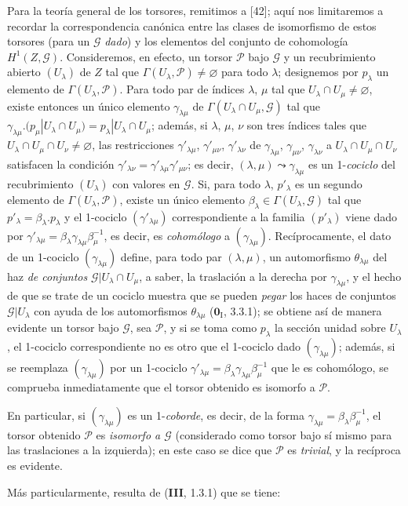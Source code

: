\begin{env}[16.5.15]
Para la teoría general de los torsores, remitimos a [42]; aquí nos
limitaremos a recordar la correspondencia canónica entre las clases
de isomorfismo de estos torsores (para un $\mathscr{G}$ \emph{dado}) y los elementos del
conjunto de cohomología $H^1(Z,\mathscr{G})$. Consideremos, en efecto, un
torsor $\mathscr{P}$ bajo $\mathscr{G}$ y un recubrimiento abierto
$(U_\lambda)$ de $Z$ tal que
$\Gamma(U_\lambda,\mathscr{P})\neq\varnothing$ para todo $\lambda$;
designemos por $p_\lambda$ un elemento de
$\Gamma(U_\lambda,\mathscr{P})$. Para todo par de índices $\lambda$, $\mu$
tal que $U_\lambda\cap U_\mu\neq\varnothing$, existe entonces un único elemento
$\gamma_{\lambda\mu}$ de
$\Gamma(U_\lambda\cap U_\mu,\mathscr{G})$ tal que
$\gamma_{\lambda\mu}.(p_\mu|U_\lambda\cap U_\mu)=p_\lambda|U_\lambda\cap U_\mu$;
además, si $\lambda$, $\mu$, $\nu$ son tres índices tales que
$U_\lambda\cap U_\mu\cap U_\nu\neq\varnothing$, las restricciones
$\gamma'_{\lambda\mu}$, $\gamma'_{\mu\nu}$, $\gamma'_{\lambda\nu}$ de
$\gamma_{\lambda\mu}$, $\gamma_{\mu\nu}$, $\gamma_{\lambda\nu}$ a
$U_\lambda\cap U_\mu\cap U_\nu$ satisfacen la condición
$\gamma'_{\lambda\nu}=\gamma'_{\lambda\mu}\gamma'_{\mu\nu}$; es decir,
$(\lambda,\mu)\leadsto\gamma_{\lambda\mu}$ es un 1-\emph{cociclo} del
recubrimiento $(U_\lambda)$ con valores en $\mathscr{G}$. Si, para todo
$\lambda$, $p'_\lambda$ es un segundo elemento de
$\Gamma(U_\lambda,\mathscr{P})$, existe un único elemento
$\beta_\lambda\in\Gamma(U_\lambda,\mathscr{G})$ tal que
$p'_\lambda=\beta_\lambda.p_\lambda$ y el 1-cociclo
$(\gamma'_{\lambda\mu})$ correspondiente a la familia $(p'_\lambda)$ viene dado
por
$\gamma'_{\lambda\mu}=\beta_\lambda\gamma_{\lambda\mu}\beta_\mu^{-1}$,
es decir, es \emph{cohomólogo} a $(\gamma_{\lambda\mu})$.
Recíprocamente, el dato de un 1-cociclo $(\gamma_{\lambda\mu})$ define, para
todo par $(\lambda,\mu)$, un automorfismo $\theta_{\lambda\mu}$ del
haz \emph{de conjuntos}
$\mathscr{G}|U_\lambda\cap U_\mu$, a saber, la traslación a la derecha por
$\gamma_{\lambda\mu}$, y el hecho de que se trate de un cociclo muestra que se
pueden \emph{pegar} los haces de conjuntos $\mathscr{G}|U_\lambda$ con
ayuda de los automorfismos $\theta_{\lambda\mu}$ ($\mathbf{0}_{\mathrm I}$, 3.3.1); se obtiene así
de manera evidente un torsor bajo $\mathscr{G}$, sea $\mathscr{P}$, y si
se toma como $p_\lambda$ la sección unidad sobre $U_\lambda$, el
1-cociclo correspondiente no es otro que el 1-cociclo dado
$(\gamma_{\lambda\mu})$; además, si se reemplaza
$(\gamma_{\lambda\mu})$ por un 1-cociclo
$\gamma'_{\lambda\mu}=\beta_\lambda\gamma_{\lambda\mu}\beta_\mu^{-1}$ que
le es cohomólogo, se comprueba inmediatamente que el torsor obtenido es isomorfo
a $\mathscr{P}$.

En particular, si $(\gamma_{\lambda\mu})$ es un 1-\emph{coborde}, es decir,
de la forma
$\gamma_{\lambda\mu}=\beta_\lambda\beta_\mu^{-1}$, el torsor obtenido
$\mathscr{P}$ es \emph{isomorfo a $\mathscr{G}$} (considerado como torsor
bajo sí mismo para las traslaciones a la izquierda); en este caso se dice que
$\mathscr{P}$ es \emph{trivial}, y la recíproca es evidente.

Más particularmente, resulta de (\textbf{III}, 1.3.1) que se tiene:
\end{env}

